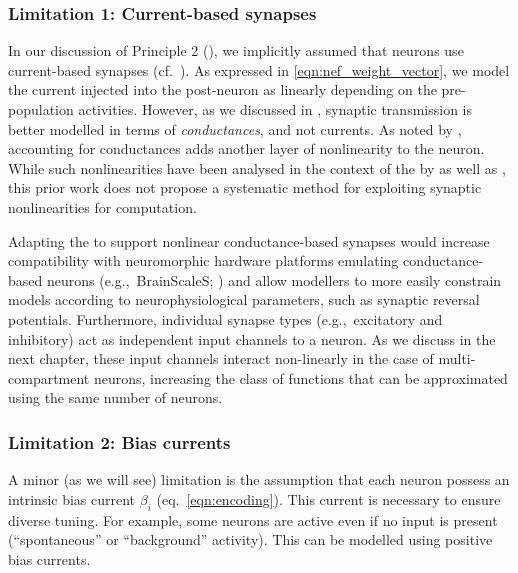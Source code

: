 
\subsubsection{Limitation 1: Current-based synapses}
In our discussion of Principle 2 (), we implicitly assumed that neurons use current-based synapses (cf.~).
As expressed in \cref{eqn:nef_weight_vector}, we model the current injected into the post-neuron as linearly depending on the pre-population activities.
However, as we discussed in , synaptic transmission is better modelled in terms of \emph{conductances}, and not currents.
As noted by \citet[Section~2.1.2, p.~35]{eliasmith2003neural}, accounting for conductances adds another layer of nonlinearity to the neuron.
While such nonlinearities have been analysed in the context of the \NEF by \citet[Chapter~4]{tripp2009search} as well as \citet{bobier2014unifying}, this prior work does not propose a systematic method for exploiting synaptic nonlinearities for computation.

Adapting the \NEF to support nonlinear conductance-based synapses would increase compatibility with neuromorphic hardware platforms emulating conductance-based neurons (e.g.,~BrainScaleS; \cite{schemmel2010waferscale}) and allow modellers to more easily constrain models according to neurophysiological parameters, such as synaptic reversal potentials.
Furthermore, individual synapse types (e.g.,~excitatory and inhibitory) act as independent input channels to a neuron.
As we discuss in the next chapter, these input channels interact non-linearly in the case of multi-compartment neurons, increasing the class of functions that can be approximated using the same number of neurons.


\subsubsection{Limitation 2: Bias currents}
A minor (as we will see) limitation is the assumption that each neuron possess an intrinsic bias current $\beta_i$ (eq.~\ref{eqn:encoding}).
This current is necessary to ensure diverse tuning.
For example, some neurons are active even if no input is present (\enquote{spontaneous} or \enquote{background} activity).
This can be modelled using positive bias currents.

